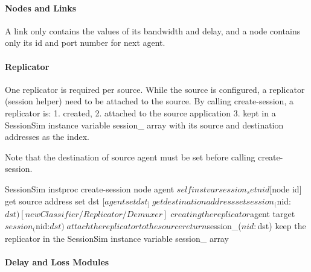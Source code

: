 \documentclass{article}
\begin{document}
\paragraph{Nodes and Links}
\label{sec:session-nodenlink}
A link only contains the values of
its bandwidth and delay, and a node contains only its id and port number
for next agent.


\paragraph{Replicator}
One replicator is required per source.  While the source is configured,
a replicator (session helper) need to be attached to the source.  By
calling create-session{}, a replicator is:
1. created,
2. attached to the source application
3. kept in a SessionSim instance variable session_ array with 
its source and destination addresses as the index.

Note that the destination of source agent must be set before
calling create-session{}.

\begin{program}
SessionSim instproc create-session { node agent } {
    $self instvar session_

    set nid [$node id]                           \; get source address
    set dst [$agent set dst_]                    \; get destination address
    set session_($nid:$dst) [new Classifier/Replicator/Demuxer]  \; creating the replicator
    $agent target $session_($nid:$dst)           \; attach the replicator to the source
    return $session_($nid:$dst)                  \; keep the replicator in the SessionSim instance variable session_ array
}
\end{program}

\paragraph{Delay and Loss Modules}
\end{document}
